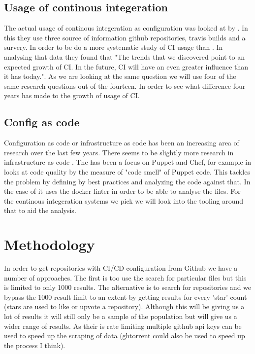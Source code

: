 \documentclass[twoside,12pt,titlepage,a4paper]{article}
\begin{document}
\vspace*{-0.05in}
\subsection{Usage of continous integeration}
\vspace*{-0.05in}

The actual usage of continous integeration as configuration was looked at by \cite{Hilton2016}. In this they use three source of information github repositories, travis builds and a survery. In order to be do a more systematic study of CI usage than \cite{Vasilescu2015}. In analysing that data they found that "The trends that we discovered point to an expected growth of CI. In the future, CI will have an even greater influence than it has today.". As we are looking at the same question we will use four of the same research questions out of the fourteen. In order to see what difference four years has made to the growth of usage of CI.

\vspace*{-0.05in}
\subsection{Config as code}
\vspace*{-0.05in}

Configuration as code or infrastructure as code has been an increasing area of research over the last few years. There seems to be slightly more research in infrastructure as code \cite{Rahman2019}. The has been a focus on Puppet and Chef, for example in \cite{Sharma2016} looks at code quality by the measure of "code smell" of Puppet code. This tackles the problem by defining by best practices and analyzing the code against that. In the case of \cite{Cito2017} it uses the docker linter in order to be able to analyse the files. 
For the continous integeration systems we pick we will look into the tooling around that to aid the analysis.


\section{Methodology}
\label{methodology}

In order to get repositories with CI/CD configuration from Github we have a number of approaches. The first is too use the search for particular files but this is limited to only 1000 results. The alternative is to search for repositories and we bypass the 1000 result limit to an extent by getting results for every 'star' count (stars are used to like or upvote a repository). Although this will be giving us a lot of results it will still only be a sample of the population but will give us a wider range of results. As their is rate limiting multiple github api keys can be used to speed up the scraping of data (ghtorrent could also be used to speed up the process I think).
\end{document}
